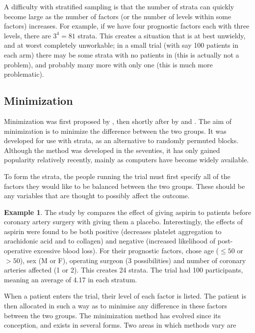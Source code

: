\documentclass[
  openany]{book}
\theoremstyle{definition}
\theoremstyle{definition}
\newtheorem{example}{Example}[chapter]
\theoremstyle{definition}
\theoremstyle{definition}
\theoremstyle{remark}
\begin{document}
A difficulty with stratified sampling is that the number of strata can quickly become large as the number of factors (or the number of levels within some factors) increases. For example, if we have four prognostic factors each with three levels, there are \(3^4=81\) strata. This creates a situation that is at best unwieldy, and at worst completely unworkable; in a small trial (with say 100 patients in each arm) there may be some strata with no patients in (this is actually not a problem), and probably many more with only one (this is much more problematic).

\subsection{Minimization}\label{minimization}

Minimization was first proposed by \citet{taves1974minimization}, then shortly after by \citet{pocock1975sequential} and \citet{freedman1976use}. The aim of minimization is to minimize the difference between the two groups. It was developed for use with strata, as an alternative to randomly permuted blocks. Although the method was developed in the seventies, it has only gained popularity relatively recently, mainly as computers have become widely available.

To form the strata, the people running the trial must first specify all of the factors they would like to be balanced between the two groups. These should be any variables that are thought to possibly affect the outcome.

\begin{example}
The study by \citet{kallis1994pre} compares the effect of giving aspirin to patients before coronary artery surgery with giving them a placebo. Interestingly, the effects of aspirin were found to be both positive (decreases platelet aggregation to arachidonic acid and to collagen) and negative (increased likelihood of post-operative excessive blood loss).
For their prognostic factors, \citet{kallis1994pre} chose age (\(\leq{50}\) or \(>50\)), sex (M or F), operating surgeon (3 possibilities) and number of coronary arteries affected (1 or 2). This creates 24 strata. The trial had 100 participants, meaning an average of 4.17 in each stratum.
\end{example}

When a patient enters the trial, their level of each factor is listed. The patient is then allocated in such a way as to minimise any difference in these factors between the two groups. The minimization method has evolved since its conception, and exists in several forms. Two areas in which methods vary are
\end{document}
